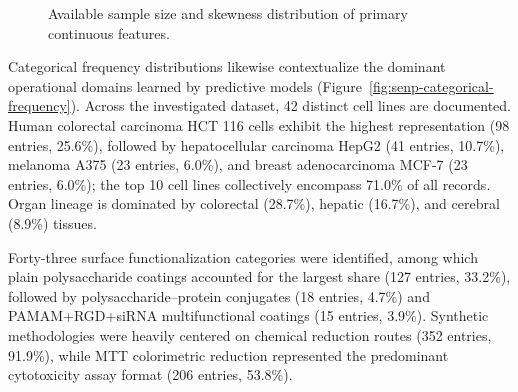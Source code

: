 \begin{figure}[H]
  \begin{minipage}{0.62\linewidth}
    \centering
  \end{minipage}
  \caption{Available sample size and skewness distribution of primary continuous features.}
  \label{fig:senp-continuous-summary}
\end{figure}

Categorical frequency distributions likewise contextualize the dominant operational domains learned by predictive models (Figure~\ref{fig:senp-categorical-frequency}). Across the investigated dataset, 42 distinct cell lines are documented. Human colorectal carcinoma HCT 116 cells exhibit the highest representation (98 entries, 25.6\%), followed by hepatocellular carcinoma HepG2 (41 entries, 10.7\%), melanoma A375 (23 entries, 6.0\%), and breast adenocarcinoma MCF-7 (23 entries, 6.0\%); the top 10 cell lines collectively encompass 71.0\% of all records. Organ lineage is dominated by colorectal (28.7\%), hepatic (16.7\%), and cerebral (8.9\%) tissues.

Forty-three surface functionalization categories were identified, among which plain polysaccharide coatings accounted for the largest share (127 entries, 33.2\%), followed by polysaccharide--protein conjugates (18 entries, 4.7\%) and PAMAM+RGD+siRNA multifunctional coatings (15 entries, 3.9\%). Synthetic methodologies were heavily centered on chemical reduction routes (352 entries, 91.9\%), while MTT colorimetric reduction represented the predominant cytotoxicity assay format (206 entries, 53.8\%).

